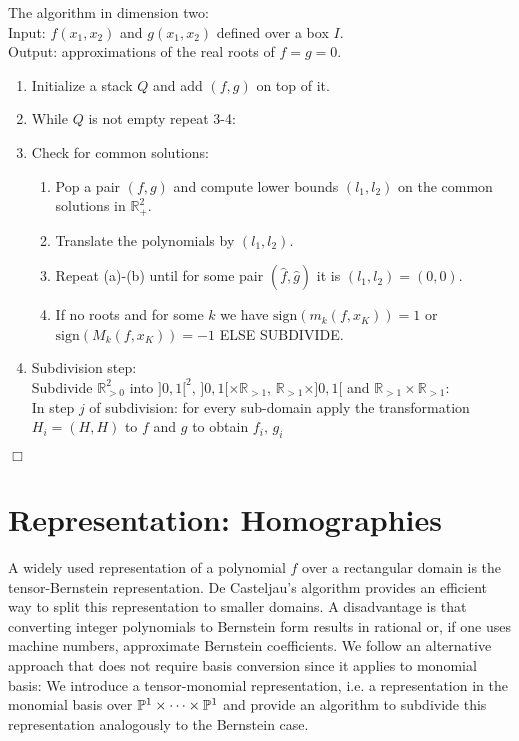 \documentclass{sig-alternate}
\newenvironment{bc}{\noindent{\bf Bivariate case:}}{\hfill$\Box$\medskip}
\def\RR{\mathbb{R}}
\begin{document}
\begin{bc}
The algorithm in dimension two:\\
Input: $f(x_1,x_2)$ and $g(x_1,x_2)$ defined over a box $I$. \\
Output: approximations of  the real roots of $f=g=0$. 
\begin{enumerate}
 \item Initialize a stack $Q$ and add $(f,g)$ on top of it.
 \item While $Q$ is not empty repeat 3-4:

\item Check for common solutions:
\begin{enumerate}
 \item Pop a pair $(f,g)$ and compute lower bounds $(l_1, l_2)$ on the common solutions in $\RR_{+}^2$.
 \item Translate the polynomials by $(l_1,l_2)$.
 \item Repeat (a)-(b) until for some pair $(\widehat f, \widehat g)$ it is $(l_1,l_2)=(0,0)$.
 \item If no roots and for some $k$ we have $\text{sign}(m_k(f,x_K))=1$ or $\text{sign}(M_k(f,x_K))=-1$ ELSE SUBDIVIDE.
\end{enumerate}
\item Subdivision step:\\
Subdivide $\RR^2_{>0}$ into $]0,1[^2$, $]0,1[\times \RR_{>1}$, $\RR_{>1}\times ]0,1[$ and $\RR_{>1}\times\RR_{>1}$:\\
In step $j$ of subdivision: for every sub-domain apply the transformation $H_i=(H,H)$ to $f$ and $g$ to obtain $f_i, \, g_i $
\end{enumerate}
\end{bc}
\fi 

\section{Representation: Homographies} \label{homography}


A widely used representation of a polynomial $f$ over a rectangular
domain is the tensor-Bernstein representation. De Casteljau's
algorithm provides an efficient way to split this representation to
smaller domains. A disadvantage is that converting integer polynomials
to Bernstein form results in rational or, if one uses machine numbers,
approximate Bernstein coefficients. We follow an alternative approach
that does not require basis conversion since it applies to monomial
basis: We introduce a tensor-monomial representation, i.e. a
representation in the monomial basis over ${\mathbb P}^1\times\cdots\times
{\mathbb P}^1$ and provide an algorithm to subdivide this representation
analogously to the Bernstein case.
\end{document}
